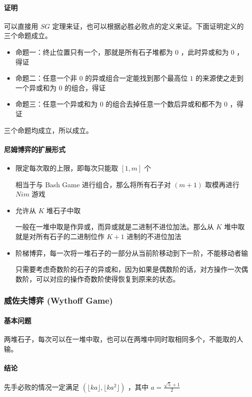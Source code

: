 \documentclass[UTF-8]{ctexart}
\begin{document}
			\paragraph{证明} 可以直接用 $SG$ 定理来证，也可以根据必胜必败点的定义来证。下面证明定义的三个命题成立。
			\begin{itemize}
				\item 命题一：终止位置只有一个，那就是所有石子堆都为 $0$ ，此时异或和为 $0$ ，得证  
				\item 命题二：任意一个非 $0$ 的异或组合一定能找到那个最高位 $1$ 的来源使之走到一个异或和为 $0$ 的组合，得证  
				\item 命题三：任意一个异或和为 $0$ 的组合去掉任意一个数后异或和都不为 $0$ ，得证  
			\end{itemize}
			三个命题均成立，所以成立。
			\paragraph{尼姆博弈的扩展形式}
			\begin{itemize}
				\item 限定每次取的上限，即每次只能取 $[1,m]$ 个
			
				相当于与 Bash Game 进行组合，那么将所有石子对 $(m+1)$ 取模再进行 $Nim$ 游戏
				\item 允许从 $K$ 堆石子中取
			
				一般在一堆中取是作异或，而异或就是二进制不进位加法。那么从 $K$ 堆中取就是对所有石子的二进制位作 $K+1$ 进制的不进位加法
				\item 阶梯博弈，每一次将一堆石子的一部分从当前阶移动到下一阶，不能移动者输
			
				只需要考虑奇数阶的石子的异或和，因为如果是偶数阶的话，对方操作一次偶数阶，可以对应的操作奇数阶使得恢复到原来的状态。
			\end{itemize}
			
			\subsubsection{威佐夫博弈 (Wythoff Game)}
			\paragraph{基本问题} 两堆石子，每次可以在一堆中取，也可以在两堆中同时取相同多个，不能取的人输。
			\paragraph{结论} 先手必败的情况一定满足 $(\lfloor ka\rfloor,\lfloor ka^2 \rfloor )$ ，其中 $a=\frac{\sqrt{5}+1}{2}$
			
\end{document}
